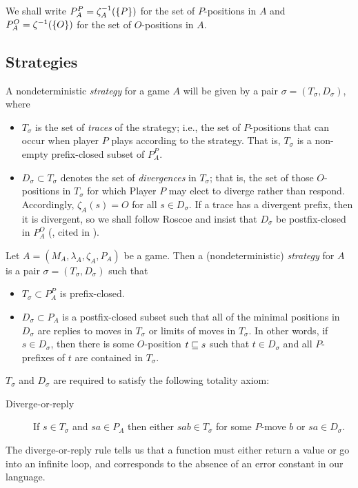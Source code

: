 \documentclass{entcs} \usepackage{prentcsmacro}
\newcommand{\0}{{\mathtt{0}}}
\begin{document}
We shall write $P_A^P=\zeta_A^{-1}(\{P\})$ for the set of $P$-positions in $A$ and $P_A^O=\zeta^{-1}(\{O\})$ for the set of $O$-positions in $A$.

\subsection{Strategies}

A nondeterministic \emph{strategy} for a game $A$ will be given by a pair $\sigma=(T_\sigma, D_\sigma)$, where
\begin{itemize}
  \item $T_\sigma$ is the set of \emph{traces} of the strategy; i.e., the set of $P$-positions that can occur when player $P$ plays according to the strategy.  That is, $T_\sigma$ is a non-empty prefix-closed subset of $P_A^P$.  

  \item $D_\sigma\subset T_\sigma$ denotes the set of \emph{divergences} in $T_\sigma$; that is, the set of those $O$-positions in $T_\sigma$ for which Player $P$ may elect to diverge rather than respond.  Accordingly, $\zeta_A(s)=O$ for all $s\in D_\sigma$.  If a trace has a divergent prefix, then it is divergent, so we shall follow Roscoe and insist that $D_\sigma$ be postfix-closed in $P_A^O$ (\cite{RoscoeCspInfinite}, cited in \cite{mcCHFiniteND}).
\end{itemize}

\begin{definition}
  Let $A=(M_A,\lambda_A,\zeta_A,P_A)$ be a game.  Then a (nondeterministic) \emph{strategy} for $A$ is a pair $\sigma=(T_\sigma,D_\sigma)$ such that
  \begin{itemize}
    \item $T_\sigma\subset P_A^P$ is prefix-closed.
    \item $D_\sigma\subset P_A$ is a postfix-closed subset such that all of the minimal positions in $D_\sigma$ are replies to moves in $T_\sigma$ or limits of moves in $T_\sigma$.  In other words, if $s\in D_\sigma$, then there is some $O$-position $t\sqsubseteq s$ such that $t\in D_\sigma$ and all $P$-prefixes of $t$ are contained in $T_\sigma$.
  \end{itemize}

  $T_\sigma$ and $D_\sigma$ are required to satisfy the following totality axiom:
  \begin{description}
    \item[Diverge-or-reply] If $s\in T_\sigma$ and $sa\in P_A$ then either $sab\in T_\sigma$ for some $P$-move $b$ or $sa\in D_\sigma$.  
  \end{description}

  The diverge-or-reply rule tells us that a function must either return a value or go into an infinite loop, and corresponds to the absence of an error constant in our language.  
\end{definition}
\end{document}

